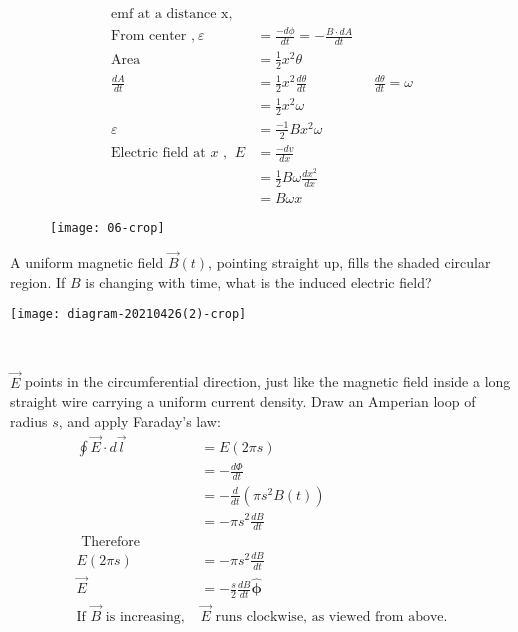 \begin{answer}$\left. \right. $\\
	\begin{minipage}{0.35\textwidth}
		\begin{align*}
		\text{emf at a distance x,}\\
		\text{From center ,}\  \varepsilon&=\frac{-d \phi}{d t}=-\frac{B \cdot d A}{d t}\\
		\text{Area} &=\frac{1}{2} x^{2} \theta \\
		\frac{d A}{d t}&=\frac{1}{2} x^{2} \frac{d \theta}{d t} \hspace{2cm}\frac{d \theta}{d t}=\omega\\
		&=\frac{1}{2} x^{2}\omega\\
		\varepsilon&=\frac{-1}{2} B x^{2}\omega\\
		\text{Electric field at $x$ , }\ E&=\frac{-d v}{d x}\\
		&=\frac{1}{2} B\omega\frac{d x^{2}}{d x}\\
		&=B\omega x
		\end{align*}
	\end{minipage}
	\begin{minipage}{0.35\textwidth}
	\begin{figure}[H]
		\centering
		\texttt{[image: 06-crop]}
	\end{figure}
\end{minipage}
\end{answer}
\begin{exercise}
	A uniform magnetic field $\vec{B}(t)$, pointing straight up, fills the shaded circular region. If $B$ is changing with time, what is the induced electric field?\\
	\begin{minipage}{.45\textwidth}
		\begin{center}
			\texttt{[image: diagram-20210426(2)-crop]}
		\end{center}
	\end{minipage}\\
\end{exercise}
\begin{answer}
	$\vec{E}$ points in the circumferential direction, just like the magnetic field inside a long straight wire carrying a uniform current density. Draw an Amperian loop of radius $s$, and apply Faraday's law:
	\begin{align*}
	\oint \vec{E} \cdot d \vec{l}&=E(2 \pi s)\\&=-\frac{d \Phi}{d t}\\&=-\frac{d}{d t}\left(\pi s^{2} B(t)\right)\\&=-\pi s^{2} \frac{d B}{d t}\\
	\text{	Therefore}\\
	E(2 \pi s)&=-\pi s^{2} \frac{d B}{d t}\\
	\vec{E}&=-\frac{s}{2} \frac{d B}{d t} \hat{\boldsymbol{\phi}}\\
	\text{If $\vec{B}$ is increasing, }&\text{$\vec{E}$ runs clockwise, as viewed from above.}
	\end{align*}
\end{answer}

